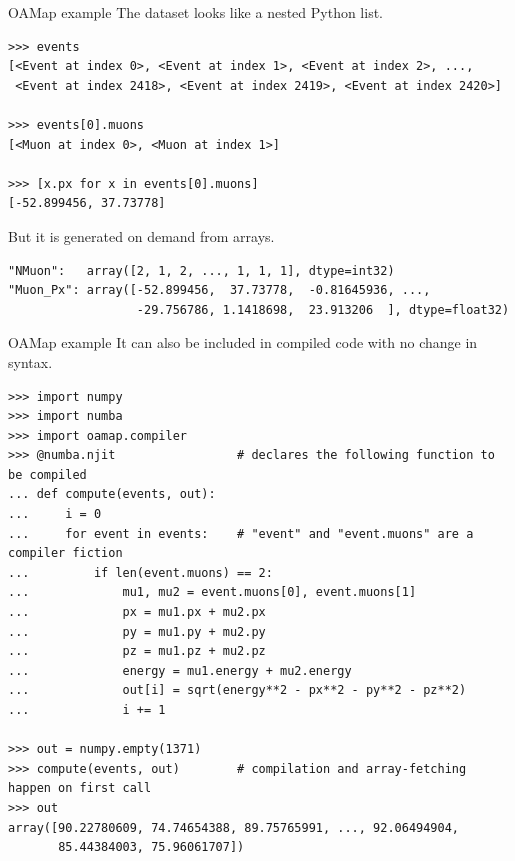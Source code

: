 \documentclass[aspectratio=169]{beamer}
\begin{document}
\begin{frame}[fragile]{OAMap example}
\vspace{0.5 cm}
\small
{\normalsize The dataset looks like a nested Python list.}
\begin{verbatim}
>>> events
[<Event at index 0>, <Event at index 1>, <Event at index 2>, ...,
 <Event at index 2418>, <Event at index 2419>, <Event at index 2420>]

>>> events[0].muons
[<Muon at index 0>, <Muon at index 1>]

>>> [x.px for x in events[0].muons]
[-52.899456, 37.73778]
\end{verbatim}

\vspace{0.5 cm}
{\normalsize But it is generated on demand from arrays.}
\begin{verbatim}
"NMuon":   array([2, 1, 2, ..., 1, 1, 1], dtype=int32)
"Muon_Px": array([-52.899456,  37.73778,  -0.81645936, ...,
                  -29.756786, 1.1418698,  23.913206  ], dtype=float32)
\end{verbatim}
\end{frame}

\begin{frame}[fragile]{OAMap example}
\vspace{0.5 cm}
\scriptsize
{\normalsize It can also be included in compiled code with no change in syntax.}
\begin{verbatim}
>>> import numpy
>>> import numba
>>> import oamap.compiler
>>> @numba.njit                 # declares the following function to be compiled
... def compute(events, out):
...     i = 0
...     for event in events:    # "event" and "event.muons" are a compiler fiction
...         if len(event.muons) == 2:
...             mu1, mu2 = event.muons[0], event.muons[1]
...             px = mu1.px + mu2.px
...             py = mu1.py + mu2.py
...             pz = mu1.pz + mu2.pz
...             energy = mu1.energy + mu2.energy
...             out[i] = sqrt(energy**2 - px**2 - py**2 - pz**2)
...             i += 1

>>> out = numpy.empty(1371)
>>> compute(events, out)        # compilation and array-fetching happen on first call
>>> out
array([90.22780609, 74.74654388, 89.75765991, ..., 92.06494904,
       85.44384003, 75.96061707])
\end{verbatim}
\end{frame}
\end{document}
